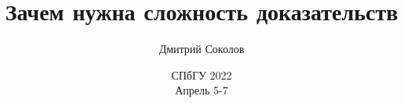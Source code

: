 

\titlegraphic{
    
}


\title[Сложность доказательств]{
    Зачем нужна сложность доказательств
}

\author[Соколов Д.]{
    Дмитрий Соколов
}  


\date{СПбГУ 2022\\ Апрель 5-7}





    \maketitle

    
    
    
    
    

